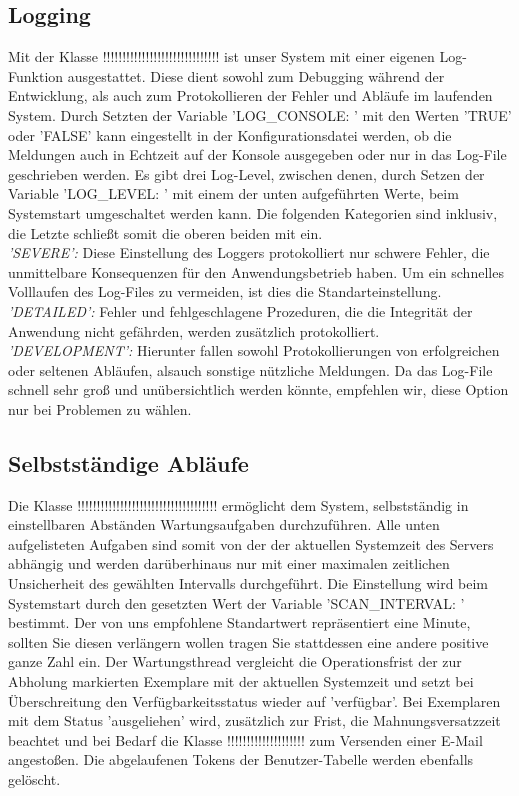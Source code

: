 \documentclass{article}
\begin{document}
\subsection{Logging}
Mit der Klasse !!!!!!!!!!!!!!!!!!!!!!!!!!!!!!\hyperlink{}{} ist unser System mit einer eigenen Log-Funktion ausgestattet. Diese dient sowohl zum Debugging während der Entwicklung, als auch zum Protokollieren der Fehler und Abläufe im laufenden System. Durch Setzten der Variable 'LOG\_CONSOLE: ' mit den Werten 'TRUE' oder 'FALSE' kann eingestellt in der Konfigurationsdatei werden, ob die Meldungen auch in Echtzeit auf der Konsole ausgegeben oder nur in das Log-File geschrieben werden. Es gibt drei Log-Level, zwischen denen, durch Setzen der Variable 'LOG\_LEVEL: ' mit einem der unten aufgeführten Werte, beim Systemstart umgeschaltet werden kann. Die folgenden Kategorien sind inklusiv, die Letzte schließt somit die oberen beiden mit ein. \\
\textit{'SEVERE':} Diese Einstellung des Loggers protokolliert nur schwere Fehler, die unmittelbare Konsequenzen für den Anwendungsbetrieb haben. Um ein schnelles Volllaufen des Log-Files zu vermeiden, ist dies die Standarteinstellung.\\
\textit{'DETAILED':} Fehler und fehlgeschlagene Prozeduren, die die Integrität der Anwendung nicht gefährden, werden zusätzlich protokolliert.\\
\textit{'DEVELOPMENT':} Hierunter fallen sowohl Protokollierungen von erfolgreichen oder seltenen Abläufen, alsauch sonstige nützliche Meldungen. Da das Log-File schnell sehr groß und unübersichtlich werden könnte, empfehlen wir, diese Option nur bei Problemen zu wählen.\\
\subsection{Selbstständige Abläufe}
Die Klasse !!!!!!!!!!!!!!!!!!!!!!!!!!!!!!!!!!!!\hyperlink{}{} ermöglicht dem System, selbstständig in einstellbaren Abständen Wartungsaufgaben durchzuführen. Alle unten aufgelisteten Aufgaben sind somit von der der aktuellen Systemzeit des Servers abhängig und werden darüberhinaus nur mit einer maximalen zeitlichen Unsicherheit des gewählten Intervalls durchgeführt. Die Einstellung wird beim Systemstart durch den gesetzten Wert der Variable 'SCAN\_INTERVAL: ' bestimmt. Der von uns empfohlene Standartwert repräsentiert eine Minute, sollten Sie diesen verlängern wollen tragen Sie stattdessen eine andere positive ganze Zahl ein. Der Wartungsthread vergleicht die Operationsfrist der zur Abholung markierten Exemplare mit der aktuellen Systemzeit und setzt bei Überschreitung den Verfügbarkeitsstatus wieder auf 'verfügbar'. Bei Exemplaren mit dem Status 'ausgeliehen' wird, zusätzlich zur Frist, die Mahnungsversatzzeit beachtet und bei Bedarf die Klasse !!!!!!!!!!!!!!!!!!!!\hyperlink{}{} zum Versenden einer E-Mail angestoßen. Die abgelaufenen Tokens der Benutzer-Tabelle werden ebenfalls gelöscht.
\end{document}
